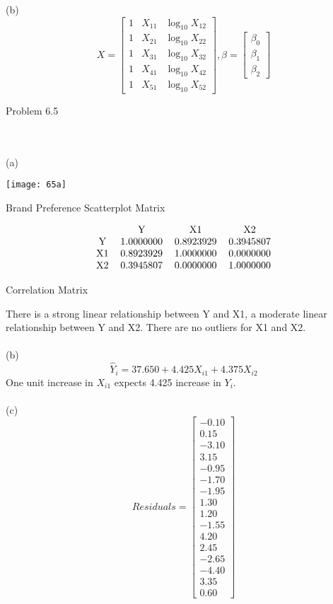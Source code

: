 \documentclass{article}
\begin{document}
(b)\[X=\begin{bmatrix}1&X_{11}&\log_{10}{X_{12}}\\1&X_{21}&\log_{10}{X_{22}}\\1&X_{31}&\log_{10}{X_{32}}\\1&X_{41}&\log_{10}{X_{42}}\\1&X_{51}&\log_{10}{X_{52}}\end{bmatrix},\beta=\begin{bmatrix}\beta_0\\\beta_1\\\beta_2\end{bmatrix}\]
\clearpage\begin{large}Problem 6.5\end{large}
\\\\(a)\begin{center}\texttt{[image: 65a]}
   \begin{center}Brand Preference Scatterplot Matrix\end{center}\end{center}
 \[\begin{tabular}{cccc}
&Y&X1&X2\\
Y&1.0000000& 0.8923929 &0.3945807\\
X1 &0.8923929& 1.0000000& 0.0000000\\
X2& 0.3945807 &0.0000000& 1.0000000
\end{tabular}\]  \begin{center}Correlation Matrix\end{center}
There is a strong linear relationship between Y and X1, a moderate linear relationship between Y and X2. There are no outliers for X1 and X2.
\\\\(b)\[\hat Y_i=37.650+4.425X_{i1}+4.375X_{i2}\]
One unit increase in $X_{i1}$ expects 4.425 increase in $Y_i$.
\\\\(c)\[Residuals=\begin{bmatrix}-0.10\\
 0.15\\
 -3.10\\
 3.15\\
 -0.95\\
 -1.70\\
-1.95\\
 1.30\\
 1.20\\
-1.55\\
  4.20\\
 2.45\\
-2.65\\
 -4.40\\
 3.35\\
 0.60\end{bmatrix}\]
\end{document}
